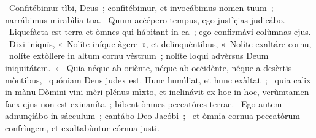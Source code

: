 \psalmChapterWithInscription{}
{ }
{%
~Confitébimur tìbi, Deus~; confitébimur, et invocábimus nomen tuum~; narrábimus mirabìlia tua. 
~Quum acċépero tempus, ego justìçias judicábo. 
~Liquefàcta est terra et òmnes qui hábitant in ea~; ego confirmávi colùmnas ejus. 
~Dixi iníquïs, «~Nolíte iníque àgere~», et delinquèntibus, «~Nolíte exaltáre cornu, 
~nolíte extòllere in altum cornu vèstrum~; nolíte loqui advèrsus Deum iniquitátem.~»
~Quia néque ab oriènte, néque ab ocċidènte, néque a desèrtïs mòntibus, 
~quóniam Deus judex est. Hunc humìliat, et hunc exàltat~; 
~quia calix in mànu Dòmini vini mèri plénus mìxto, et inclinávit ex hoc in hoc, verùmtamen faex ejus non est exinaníta~; bibent òmnes peccatóres terrae. 
~Ego autem adnunçiábo in sáeculum~; cantábo Deo Jacóbi~; 
~et òmnia cornua peccatórum confrìngem, et exaltabùntur córnua justi. 
}
